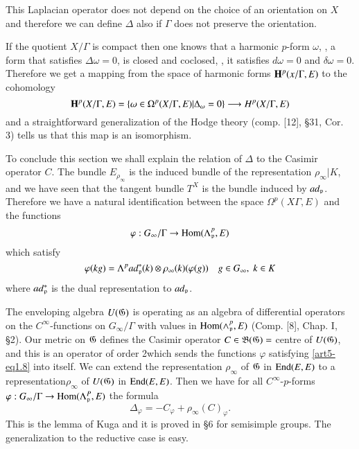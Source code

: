 This Laplacian operator does not depend on the choice of an orientation on $X$ and therefore we can define $\Delta$ also if $\Gamma$ does not preserve the orientation.

If the quotient $X / \Gamma$ is compact then one knows that a harmonic $p$-form $\omega$, \ie, a form that satisfies $\Delta \omega = 0$, is closed and coclosed, \ie, it satisfies $d \omega = 0$ and $\delta \omega = 0$. Therefore we get a mapping from the space of harmonic forms $\mathbf{H}^p (x/ \Gamma , E)$ to the cohomology
$$
\mathbf{H}^p (X/ \Gamma, E) = \{\omega \in \Omega^p (X/ \Gamma, E) | \Delta_\omega = 0 \} \longrightarrow H^p (X/ \Gamma, E)
$$
and a straightforward generalization of the Hodge theory (comp. [12], \S 31, Cor. 3) tells us that this map is an isomorphism.

To conclude this section we shall explain the relation of $\Delta$ to the Casimir operator $C$. The bundle $E_{\rho_\infty}$ is the induced bundle of the representation $\rho_\infty|K$, and we have seen that the tangent bundle $T^X$ is the bundle induced by $ad_{\mathfrak{p}}$. Therefore we have a natural identification between the space $\Omega^p (X \Gamma, E)$ and the functions
$$
\varphi : G_\infty / \Gamma \to \operatorname{Hom} (\Lambda^p_{\mathfrak{p}}, E)
$$
which satisfy
\begin{equation}
\varphi (kg) = \Lambda^p ad_{\mathfrak{p}}^\ast (k) \otimes \rho_\infty (k) (\varphi (g)) \quad g \in G_\infty, \; k \in K 
\label{art5-eq1.8}
\end{equation}
where $ad^\ast_{\mathfrak{p}}$ is the dual representation to $ad_{\mathfrak{p}}$.

The enveloping algebra $U (\mathfrak{G})$ is operating as an algebra of differential operators on the $C^\infty$-functions on $G_\infty/\Gamma$ with values in $\operatorname{Hom} (\wedge^p_{\mathfrak{p}}, E)$ (Comp. [8], Chap. I, \S 2). Our metric on $\mathfrak{G}$ defines the Casimir operator $C \in \mathfrak{B} (\mathfrak{G}) =$ centre of $U (\mathfrak{G})$, and this is an operator of order 2which sends the functions $\varphi$ satisfying \eqref{art5-eq1.8} into itself. We can extend the representation $\rho_\infty$ of $\mathfrak{G}$ in $\operatorname{End} (E, E)$ to a representation\pageoriginale $\rho_\infty$ of $U(\mathfrak{G})$ in $\operatorname{End} (E, E)$. Then we have for all $C^\infty$-$p$-forms $\varphi: G_\infty/ \Gamma \to \operatorname{Hom} (\Lambda^P_{\mathfrak{p}}, E)$ the formula
\begin{equation}
\Delta_\varphi = - C_\varphi  + \rho_\infty (C)_\varphi. 
\label{art5-eq1.9}
\end{equation}
This is the lemma of Kuga and it is proved in \cite{art5-key10} \S 6 for semisimple groups. The generalization to the reductive case is easy.


